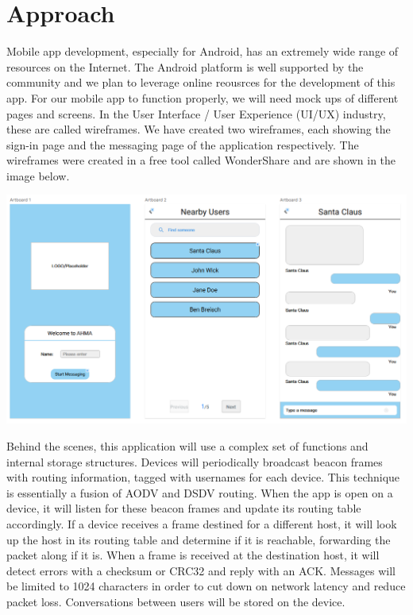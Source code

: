 \documentclass[10pt]{article}
\begin{document}
\section{Approach} %
   Mobile app development, especially for Android, has an extremely wide range of resources on the Internet. The Android platform is well supported by the community and we plan to leverage online reousrces for the development of this app. For our mobile app to function properly, we will need mock ups of different pages and screens. In the User Interface / User Experience (UI/UX) industry, these are called wireframes. We have created two wireframes, each showing the sign-in page and the messaging page of the application respectively. The wireframes were created in a free tool called WonderShare and are shown in the image below. \\
   \begin{center}
   \includegraphics[scale=0.5]{wireframe.png} \\
   \end{center}
   Behind the scenes, this application will use a complex set of functions and internal storage structures. Devices will periodically broadcast beacon frames with routing information, tagged with usernames for each device. This technique is essentially a fusion of AODV and DSDV routing. When the app is open on a device, it will listen for these beacon frames and update its routing table accordingly. If a device receives a frame destined for a different host, it will look up the host in its routing table and determine if it is reachable, forwarding the packet along if it is. When a frame is received at the destination host, it will detect errors with a checksum or CRC32 and reply with an ACK. Messages will be limited to 1024 characters in order to cut down on network latency and reduce packet loss. Conversations between users will be stored on the device.
   
\end{document}
